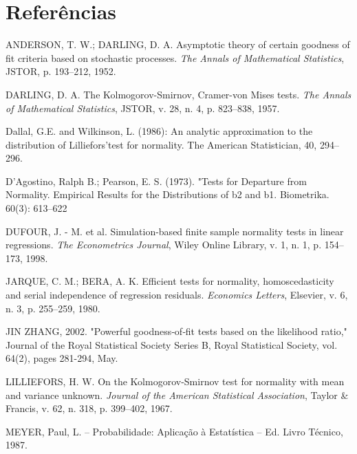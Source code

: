 \documentclass[a4paper,11pt]{article} %
\begin{document}
\section*{Referências}

\begin{flushleft}

\noindent ANDERSON, T. W.; DARLING, D. A. Asymptotic theory of certain goodness of fit criteria based on stochastic processes. {\it The Annals of Mathematical Statistics}, JSTOR, p. 193–212, 1952.\newline
    
\noindent DARLING, D. A. The Kolmogorov-Smirnov, Cramer-von Mises tests. {\it The Annals of Mathematical Statistics}, JSTOR, v. 28, n. 4, p. 823–838, 1957.\newline


\noindent Dallal, G.E. and Wilkinson, L. (1986): An analytic approximation to the distribution of Lilliefors’test for normality. The American Statistician, 40, 294–296.\newline


\noindent D'Agostino, Ralph B.; Pearson, E. S. (1973). "Tests for Departure from Normality. Empirical Results for the Distributions of b2 and b1. Biometrika. 60(3): 613–622
\newline
    
\noindent DUFOUR, J. - M. et al. Simulation-based finite sample normality tests in linear regressions. {\it The Econometrics Journal}, Wiley Online Library, v. 1, n. 1, p. 154–173, 1998.\newline
    
\noindent JARQUE, C. M.; BERA, A. K. Efficient tests for normality, homoscedasticity and serial independence of regression residuals. {\it Economics Letters}, Elsevier, v. 6, n. 3, p. 255–259, 1980.\newline

\noindent JIN ZHANG, 2002. "Powerful goodness‐of‐fit tests based on the likelihood ratio," Journal of the Royal Statistical Society Series B, Royal Statistical Society, vol. 64(2), pages 281-294, May.\newline

\noindent LILLIEFORS, H. W. On the Kolmogorov-Smirnov test for normality with mean and variance unknown. {\it Journal of the American Statistical Association}, Taylor \& Francis, v. 62, n. 318, p. 399–402, 1967.\newline

\noindent MEYER, Paul, L. – Probabilidade: Aplicação à Estatística – Ed. Livro Técnico, 1987. \newline
    

\end{flushleft}
\end{document}
